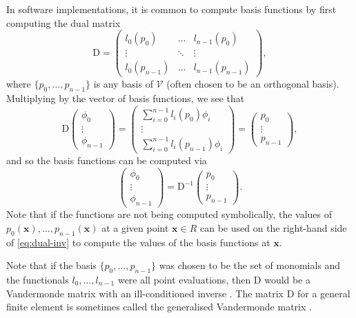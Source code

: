 \documentclass[sn-mathphys-num]{sn-jnl}%
\theoremstyle{thmstyleone}%
\newcommand{\refel}{R}
\newcommand{\polyspace}{\mathcal{V}}
\newcommand{\mat}[1]{\boldsymbol{\mathrm{#1}}}
\renewcommand{\vec}[1]{\boldsymbol{#1}}
\newcommand{\inv}{^{-1}}
\theoremstyle{thmstyletwo}%
\theoremstyle{thmstylethree}%
\begin{document}
In software implementations, it is common to compute basis functions by first computing the dual matrix \cite[section 2.2]{FIAT}
$$
\mat{D} = \begin{pmatrix}
l_0(p_0)&\dots&l_{n-1}(p_0)\\
\vdots&\ddots&\vdots\\
l_0(p_{n-1})&\dots&l_{n-1}(p_{n-1})
\end{pmatrix},
$$
where $\{p_0,\dots,p_{n-1}\}$ is any basis of $\polyspace$ (often chosen to be an orthogonal basis).
Multiplying by the vector of basis functions, we see that
\[
\mat{D}\begin{pmatrix}
\phi_0\\\vdots\\\phi_{n-1}
\end{pmatrix}
=
\begin{pmatrix}
\displaystyle
\sum_{i=0}^{n-1}l_i(p_0)\phi_i
\\\vdots\\
\displaystyle
\sum_{i=0}^{n-1}l_i(p_{n-1})\phi_i
\end{pmatrix}
=
\begin{pmatrix}
p_0\\\vdots\\p_{n-1}
\end{pmatrix},
\]
and so the basis functions can be computed via
\begin{equation}
\begin{pmatrix}
\phi_0\\\vdots\\\phi_{n-1}
\end{pmatrix}
=
\mat{D}\inv
\begin{pmatrix}
p_0\\\vdots\\p_{n-1}
\end{pmatrix}.\label{eq:dual-inv}
\end{equation}
Note that if the functions are not being computed symbolically, the values of $p_0(\vec{x}),\dots,p_{n-1}(\vec{x})$ at
a given point $\vec{x}\in\refel$ can be used on the right-hand side of \cref{eq:dual-inv} to compute the values of the basis functions at $\vec{x}$.

Note that if the basis $\{p_0,\dots,p_{n-1}\}$ was chosen to be the set of monomials
and the functionals $l_0,\dots,l_{n-1}$ were all point evaluations, then $\mat{D}$
would be a Vandermonde matrix with an ill-conditioned inverse \cite{vandermonde}.
The matrix $\mat{D}$ for a general finite element is sometimes called the generalised
Vandermonde matrix \cite[chapter 5]{ern-guermond}.
\end{document}
